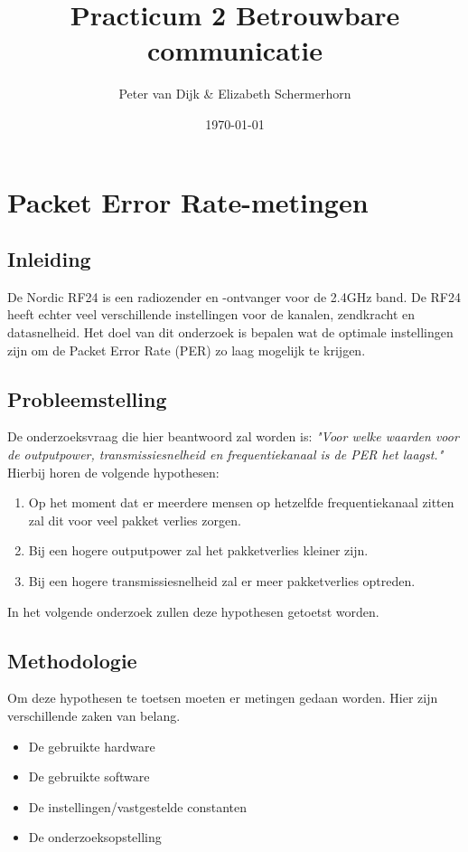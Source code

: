 \documentclass{article}
\author{Peter van Dijk \& Elizabeth Schermerhorn}
\date{\today}
\title{Practicum 2 Betrouwbare communicatie}
\begin{document}
\maketitle
\newpage
\tableofcontents
\clearpage
\section{Packet Error Rate-metingen}
\subsection{Inleiding}
De Nordic RF24 is een radiozender en -ontvanger voor de 2.4GHz band. De RF24 heeft echter veel verschillende instellingen voor de kanalen, zendkracht en datasnelheid. Het doel van dit onderzoek is bepalen wat de optimale instellingen zijn om de Packet Error Rate (PER) zo laag mogelijk te krijgen.

\subsection{Probleemstelling}
De onderzoeksvraag die hier beantwoord zal worden is: \textit{"Voor welke waarden voor de outputpower, transmissiesnelheid en frequentiekanaal is de PER het laagst."} Hierbij horen de volgende hypothesen: 
\begin{enumerate}
  \item Op het moment dat er meerdere mensen op hetzelfde frequentiekanaal zitten zal dit voor veel pakket verlies zorgen.
  \item Bij een hogere outputpower zal het pakketverlies kleiner zijn.
  \item Bij een hogere transmissiesnelheid zal er meer pakketverlies optreden. 
\end{enumerate}
In het volgende onderzoek zullen deze hypothesen getoetst worden.
\subsection{Methodologie}
Om deze hypothesen te toetsen moeten er metingen gedaan worden. Hier zijn verschillende zaken van belang. 
\begin{itemize}
	\item De gebruikte hardware
	\item De gebruikte software
	\item De instellingen/vastgestelde constanten
	\item De onderzoeksopstelling
\end{itemize}
\end{document}
